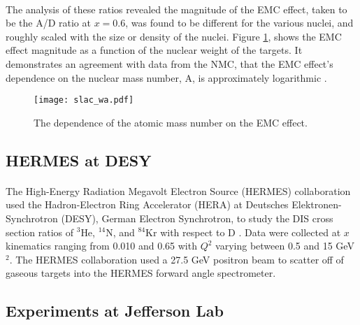 \paragraph{} The analysis of these ratios revealed the magnitude of the EMC effect, taken to be the A/D ratio at $x=0.6$, was found to be different for the various nuclei, and roughly scaled with the size or density of the nuclei. Figure \ref{gomez_wa}, shows the EMC effect magnitude as a function of the nuclear weight of the targets. It demonstrates an agreement with data from the NMC, that the EMC effect's dependence on the nuclear mass number, A, is approximately logarithmic \cite{Ajth,gomez,seelyth}. 
\begin{figure}[t]
	\centering
	\texttt{[image: slac\_wa.pdf]} 
	\caption{The dependence of the atomic mass number on the EMC effect\cite{gomez}.}
	\label{gomez_wa}
\end{figure} 
\subsection{HERMES at DESY}
\paragraph{}
The High-Energy Radiation Megavolt Electron Source (HERMES) collaboration used the Hadron-Electron Ring Accelerator (HERA) at Deutsches Elektronen-Synchrotron (DESY), German Electron Synchrotron, to study the DIS cross section ratios of $^3$He, $^{14}$N, and $^{84}$Kr with respect to D \cite{HERMES_EMC}. Data were collected at $x$ kinematics ranging from 0.010 and 0.65 with $Q^2$ varying between 0.5 and 15 GeV$^2$\cite{HERMES_EMC}. The HERMES collaboration used a 27.5 GeV positron beam to scatter off of gaseous targets into the HERMES forward angle spectrometer. 
\subsection{Experiments at Jefferson Lab}
